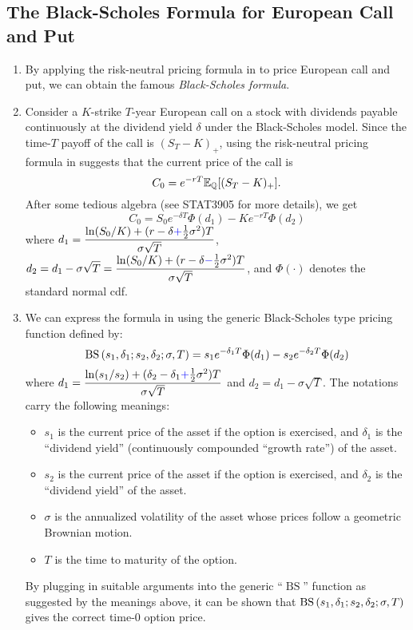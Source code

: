 \subsection{The Black-Scholes Formula for European Call and Put}
\begin{enumerate}
\item By applying the risk-neutral pricing formula in
 to price European call and put, we can obtain
the famous \emph{Black-Scholes formula}.

\item \label{it:bs-call-fmla}
 Consider a \(K\)-strike \(T\)-year European call on a stock 
with dividends payable continuously at the dividend yield \(\delta\) under the
Black-Scholes model. Since the time-\(T\) payoff of the call is
\((S_T-K)_{+}\), using the risk-neutral pricing formula in
 suggests that the current price of the call
is
\[
C_0=e^{-rT}\mathbb{E}_{\mathbb{Q}}\qty[(S_T-K)_{+}].
\]
After some tedious algebra (see STAT3905 for more details), we get
\[
C_0=\boxed{S_0e^{-\delta T}\Phi(d_1)-Ke^{-rT}\Phi(d_2)}
\]
where \(\displaystyle
d_1=\frac{\ln(S_0/K)+(r-\delta{\color{blue}+}\frac{1}{2}\sigma^2)T}{\sigma\sqrt{T}}\),
\(\displaystyle
d_2=d_1-\sigma\sqrt{T}=\frac{\ln(S_0/K)+(r-\delta{\color{blue}-}\frac{1}{2}\sigma^2)T}{\sigma\sqrt{T}}\),
and \(\Phi(\cdot)\) denotes the standard normal cdf.

\item \label{it:bs-pricing-fun}
We can express the formula in  using the generic
Black-Scholes type pricing function defined by:
\[
\operatorname{BS}\qty(s_1,\delta_1;s_2,\delta_2;\sigma,T)=s_1e^{-\delta_1 T}\Phi(d_1)-s_2e^{-\delta_2 T}\Phi(d_2)
\]
where \(\displaystyle
d_1=\frac{\ln(s_1/s_2)+(\delta_2-\delta_1{\color{blue}+}\frac{1}{2}\sigma^2)T}{\sigma\sqrt{T}}\)
and \(\displaystyle d_2=d_1-\sigma\sqrt{T}\). The notations carry the following
meanings:
\begin{itemize}
\item \(s_1\) is the current price of the asset  if the option is
exercised, and \(\delta_1\) is the ``dividend yield'' (continuously compounded
``growth rate'') of the asset.
\item \(s_2\) is the current price of the asset  if the option is
exercised, and \(\delta_2\) is the ``dividend yield'' of the asset.
\item \(\sigma\) is the annualized volatility of the asset whose prices follow
a geometric Brownian motion.
\item \(T\) is the time to maturity of the option.
\end{itemize}
By plugging in suitable arguments into the generic ``\(\operatorname{BS}\)''
function as suggested by the meanings above, it can be shown that
\(\operatorname{BS}\qty(s_1,\delta_1;s_2,\delta_2;\sigma,T)\) gives the correct time-0 option
price.


\end{enumerate}
